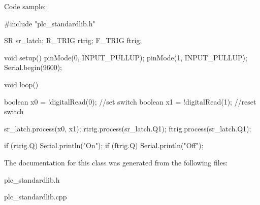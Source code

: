 Code sample\+: \begin{DoxyVerb}#include "plc_standardlib.h"

SR sr_latch;
R_TRIG rtrig;
F_TRIG ftrig;

void setup() {
    pinMode(0, INPUT_PULLUP);
    pinMode(1, INPUT_PULLUP);
    Serial.begin(9600);
}

void loop() {
    boolean x0 = !digitalRead(0); //set switch
    boolean x1 = !digitalRead(1); //reset switch

    sr_latch.process(x0, x1);
    rtrig.process(sr_latch.Q1);
    ftrig.process(sr_latch.Q1);

    if (rtrig.Q) {
        Serial.println("On");
    }
    if (ftrig.Q) {
        Serial.println("Off");
    }
}\end{DoxyVerb}
 

The documentation for this class was generated from the following files\+:\begin{DoxyCompactItemize}
\item 
plc\+\_\+standardlib.\+h\item 
plc\+\_\+standardlib.\+cpp\end{DoxyCompactItemize}
